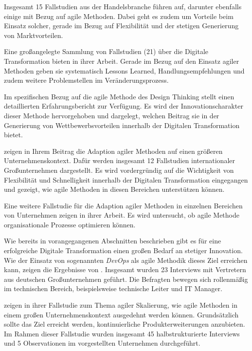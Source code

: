 Insgesamt 15 Fallstudien aus der Handelsbranche führen  auf, darunter ebenfalls einige mit Bezug auf agile Methoden. Dabei geht es zudem um Vorteile beim Einsatz solcher, gerade im Bezug auf Flexibilität und der stetigen Generierung von Marktvorteilen.

Eine großangelegte Sammlung von Fallstudien (21) über die Digitale Transformation bieten  in ihrer Arbeit. Gerade im Bezug auf den Einsatz agiler Methoden geben sie systematisch Lessons Learned, Handlungsempfehlungen und zudem weitere Problemstellen im Veränderungsprozess.

Im spezifischen Bezug auf die agile Methode des Design Thinking stellt  einen detaillierten Erfahrungsbericht zur Verfügung. Es wird der Innovationscharakter  dieser Methode hervorgehoben und dargelegt, welchen Beitrag sie in der Generierung von Wettbewerbsvorteilen innerhalb der Digitalen Transformation bietet.

 zeigen in Ihrem Beitrag die Adaption agiler Methoden auf einen größeren Unternehmenskontext. Dafür werden insgesamt 12 Fallstudien internationaler Großunternehmen dargestellt. Es wird vordergründig auf die Wichtigkeit von Flexibilität und Schnelligkeit innerhalb der Digitalen Transformation eingegangen und gezeigt, wie agile Methoden in diesen Bereichen unterstützen können.

Eine weitere Fallstudie für die Adaption agiler Methoden in einzelnen Bereichen von Unternehmen zeigen  in ihrer Arbeit. Es wird untersucht, ob agile Methode organisationale Prozesse optimieren können.

Wie bereits in vorangegangenen Abschnitten beschrieben gibt es für eine erfolgreiche Digitale Transformation einen großen Bedarf an stetiger Innovation. Wie der Einsatz von sogenannten \textit{DevOps} als agile Methodik dieses Ziel erreichen kann, zeigen die Ergebnisse von . Insgesamt wurden 23 Interviews mit Vertretern aus deutschen Großunternehmen geführt. Die Befragten bewegen sich rollenmäßig im technischen Bereich, beispielsweise technische Leiter und IT Manager.

 zeigen in ihrer Fallstudie zum Thema agiler Skalierung, wie agile Methoden in einem großen Unternehmenskontext ausgedehnt werden können. Grundsätzlich sollte das Ziel erreicht werden, kontinuierliche Produkterweiterungen anzubieten. Im Rahmen dieser Fallstudie wurden insgesamt 45 halbstrukturierte Interviews  und 5 Observationen im vorgestellten Unternehmen durchgeführt.

